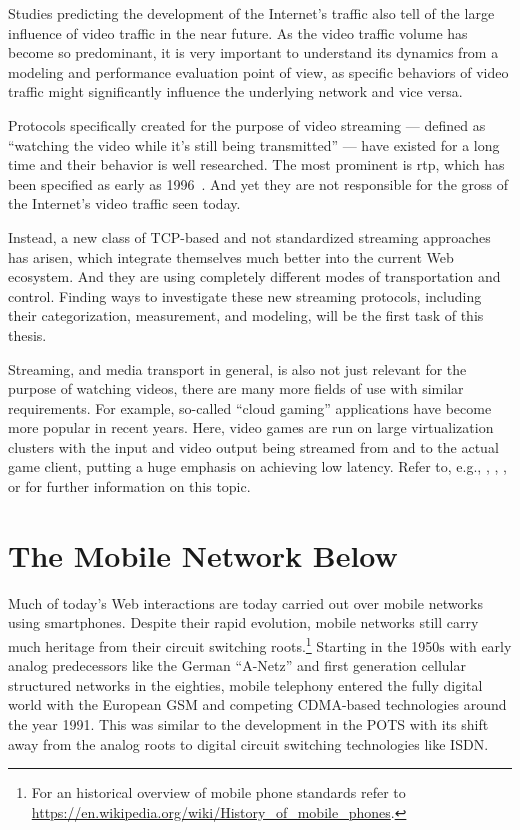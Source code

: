 Studies predicting the development of the Internet's traffic also tell of the large influence of video traffic in the near future. As the video traffic volume has become so predominant, it is very important to understand its dynamics from a modeling and performance evaluation point of view, as specific behaviors of video traffic might significantly influence the underlying network and vice versa. 

Protocols specifically created for the purpose of video streaming --- defined as ``watching the video while it's still being transmitted'' --- have existed for a long time and their behavior is well researched. The most prominent is \gls{rtp}, which has been specified as early as 1996~\cite{rfc1889}. And yet they are not responsible for the gross of the Internet's video traffic seen today.

Instead, a new class of \gls{TCP}-based and not standardized streaming approaches has arisen, which integrate themselves much better into the current Web ecosystem. And they are using completely different modes of transportation and control. Finding ways to investigate these new streaming protocols, including their categorization, measurement, and modeling, will be the first task of this thesis.

Streaming, and media transport in general, is also not just relevant for the purpose of watching videos, there are many more fields of use with similar requirements. For example, so-called ``cloud gaming'' applications have become more popular in recent years. Here, video games are run on large virtualization clusters with the input and video output being streamed from and to the actual game client, putting a huge emphasis on achieving low latency. Refer to, e.g., \cite{4795441}, \cite{wang2009modeling}, \cite{jarschel2011cloudevaluation}, or \cite{ct2010wolken} for further information on this topic.


\section{The Mobile Network Below}

Much of today's Web interactions are today carried out over mobile networks using smartphones. Despite their rapid evolution, mobile networks still carry much heritage from their circuit switching roots.\footnote{For an historical overview of mobile phone standards refer to \url{https://en.wikipedia.org/wiki/History_of_mobile_phones}.}
Starting in the 1950s with early analog predecessors like the German ``A-Netz'' and first generation cellular structured networks in the eighties, mobile telephony entered the fully digital world with the European \gls{GSM} and competing \gls{CDMA}-based technologies around the year 1991. This was similar to the development in the \gls{POTS} with its shift away from the analog roots to digital circuit switching technologies like \gls{ISDN}.

